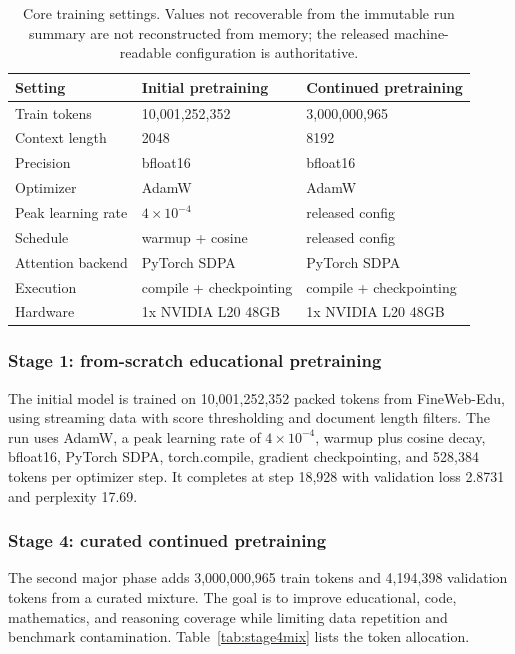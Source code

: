 \documentclass[11pt]{article}
\begin{document}
\begin{table}[h]
\centering
\small
\begin{tabularx}{\linewidth}{Yll}
\toprule
Setting & Initial pretraining & Continued pretraining \\
\midrule
Train tokens & 10,001,252,352 & 3,000,000,965 \\
Context length & 2048 & 8192 \\
Precision & bfloat16 & bfloat16 \\
Optimizer & AdamW & AdamW \\
Peak learning rate & $4\times10^{-4}$ & released config \\
Schedule & warmup + cosine & released config \\
Attention backend & PyTorch SDPA & PyTorch SDPA \\
Execution & compile + checkpointing & compile + checkpointing \\
Hardware & 1x NVIDIA L20 48GB & 1x NVIDIA L20 48GB \\
\bottomrule
\end{tabularx}
\caption{Core training settings. Values not recoverable from the immutable run summary are not reconstructed from memory; the released machine-readable configuration is authoritative.}
\label{tab:training}
\end{table}

\subsubsection*{Stage 1: from-scratch educational pretraining}
The initial model is trained on 10,001,252,352 packed tokens from FineWeb-Edu, using streaming data with score thresholding and document length filters. The run uses AdamW, a peak learning rate of \(4\times10^{-4}\), warmup plus cosine decay, bfloat16, PyTorch SDPA, torch.compile, gradient checkpointing, and 528,384 tokens per optimizer step. It completes at step 18,928 with validation loss 2.8731 and perplexity 17.69.

\subsubsection*{Stage 4: curated continued pretraining}
The second major phase adds 3,000,000,965 train tokens and 4,194,398 validation tokens from a curated mixture. The goal is to improve educational, code, mathematics, and reasoning coverage while limiting data repetition and benchmark contamination. Table~\ref{tab:stage4mix} lists the token allocation.
\end{document}
